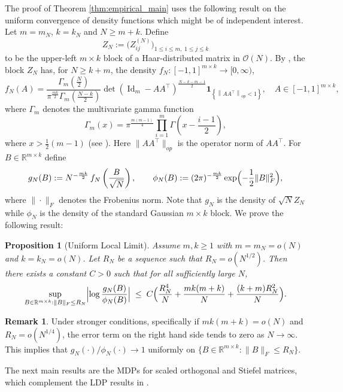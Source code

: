 \documentclass[11pt,a4paper,twoside]{article}
\renewcommand{\O}{\mathcal O}
\newtheorem{proposition}[thm]{Proposition}
\theoremstyle{definition}
\newtheorem{rmk}[thm]{Remark}
\begin{document}
	  \noindent The proof of Theorem \ref{thm:empirical_main} uses the following result on the uniform convergence of density functions which might be of independent interest. Let \(m=m_N\), \(k=k_N\) and \(N\ge m+k\). Define
		\[
		Z_N := \bigl(Z_{ij}^{(N)}\bigr)_{1\le i\le m,\;1\le j\le k}
		\]
		to be the upper-left \(m\times k\) block of a Haar-distributed matrix in \(\O(N)\). \noindent By \cite[Lemma 2.5]{jiang2006many}, the block $Z_N$ has, for $N\ge k+m$, the density $f_N:[-1,1]^{m\times k}\to [0,\infty)$,
		$$
		f_N(A)=\frac{\Gamma_m\left(\frac{N}{2}\right)}{\pi^{\frac{m k}{2}} \Gamma_m\left(\frac{N-k}{2}\right)} \operatorname{det}\left(\operatorname{Id}_{m}-A A^\top\right)^{\frac{N-k-m-1}{2}} \mathbf{1}_{\left\{\left\|A A^\top\right\|_{op}<1\right\}}, \quad A \in[-1,1]^{m \times k},
		$$
		where $\Gamma_m$ denotes the multivariate gamma function
		$$
		\Gamma_m(x)=\pi^{\frac{m(m-1)}{4}} \prod_{i=1}^m \Gamma\left(x-\frac{i-1}{2}\right),
		$$
		where $x> \frac{1}{2}(m-1)$ (see \cite[Theorem 1.4.1]{gupta2018matrix}). Here \(\|AA^\top\|_{op}\) is the operator norm of \(AA^\top\). For \(B\in\mathbb R^{m\times k}\) define
		\[
		g_N(B)
		:= N^{-\frac{mk}{2}}\,f_N\left(\frac{B}{\sqrt{N}}\right),
		\qquad
		\phi_N(B)
		:= (2\pi)^{-\frac{mk}{2}}
		\exp\Bigl(-\frac12\|B\|_F^2\Bigr),
		\]
		where $\|\cdot\|_F$ denotes the Frobenius norm. Note that $g_N$ is the density of $\sqrt{N} Z_N$ while $\phi_N$ is the density of the standard Gaussian $m\times k$ block. We prove the following result:

		\begin{proposition}[Uniform Local Limit]
		\label{prop:uniform_local_limit}
		Assume \(m, k \ge 1\) with \(m = m_N = o(N)\) and \(k= k_N = o(N)\). Let \(R_N\) be a sequence such that \(R_N = o(N^{1/2})\). Then there exists a constant \(C>0\) such that for all sufficiently large \(N\),
		\[
		\sup_{B\in\mathbb R^{m\times k}: \|B\|_F \le R_N}
		\Bigl|
		\log \frac{g_N(B)}{\phi_N(B)}
		\Bigr|
		\;\le\;
		C\Bigl(\frac{R_N^4}{N} + \frac{mk(m+k)}{N} + \frac{(k+m)R_N^2}{N}\Bigr).
		\]
		\end{proposition}

\begin{rmk}
Under stronger conditions, specifically if $mk(m+k)=o(N)$ and $R_N = o(N^{1/4})$, the error term on the right hand side tends to zero as $N \to \infty$. This implies that $g_N(\cdot)/\phi_N(\cdot) \to 1$ uniformly on $\{B \in \mathbb{R}^{m\times k} : \|B\|_F \le R_N\}$.
\end{rmk}

    The next main results are the MDPs for scaled orthogonal and Stiefel matrices, which complement the LDP results in \cite[Theorem A and B]{KabluchkoLarge}.
\end{document}

